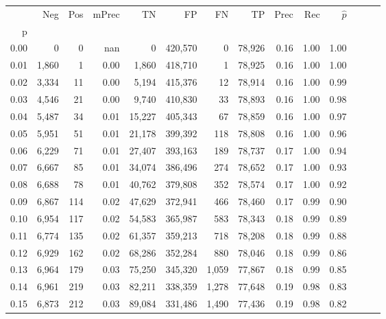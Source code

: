 \begin{tabular}{rrrrrrrrrrrrrr}
\toprule
{} &    Neg &    Pos & mPrec &       TN &       FP &      FN &      TP &  Prec &   Rec & $\hat{p}$ \\
p    &        &        &       &          &          &         &         &       &       &           \\
\midrule
0.00 &      0 &      0 &   nan &        0 &  420,570 &       0 &  78,926 &  0.16 &  1.00 &      1.00 \\
0.01 &  1,860 &      1 &  0.00 &    1,860 &  418,710 &       1 &  78,925 &  0.16 &  1.00 &      1.00 \\
0.02 &  3,334 &     11 &  0.00 &    5,194 &  415,376 &      12 &  78,914 &  0.16 &  1.00 &      0.99 \\
0.03 &  4,546 &     21 &  0.00 &    9,740 &  410,830 &      33 &  78,893 &  0.16 &  1.00 &      0.98 \\
0.04 &  5,487 &     34 &  0.01 &   15,227 &  405,343 &      67 &  78,859 &  0.16 &  1.00 &      0.97 \\
0.05 &  5,951 &     51 &  0.01 &   21,178 &  399,392 &     118 &  78,808 &  0.16 &  1.00 &      0.96 \\
0.06 &  6,229 &     71 &  0.01 &   27,407 &  393,163 &     189 &  78,737 &  0.17 &  1.00 &      0.94 \\
0.07 &  6,667 &     85 &  0.01 &   34,074 &  386,496 &     274 &  78,652 &  0.17 &  1.00 &      0.93 \\
0.08 &  6,688 &     78 &  0.01 &   40,762 &  379,808 &     352 &  78,574 &  0.17 &  1.00 &      0.92 \\
0.09 &  6,867 &    114 &  0.02 &   47,629 &  372,941 &     466 &  78,460 &  0.17 &  0.99 &      0.90 \\
0.10 &  6,954 &    117 &  0.02 &   54,583 &  365,987 &     583 &  78,343 &  0.18 &  0.99 &      0.89 \\
0.11 &  6,774 &    135 &  0.02 &   61,357 &  359,213 &     718 &  78,208 &  0.18 &  0.99 &      0.88 \\
0.12 &  6,929 &    162 &  0.02 &   68,286 &  352,284 &     880 &  78,046 &  0.18 &  0.99 &      0.86 \\
0.13 &  6,964 &    179 &  0.03 &   75,250 &  345,320 &   1,059 &  77,867 &  0.18 &  0.99 &      0.85 \\
0.14 &  6,961 &    219 &  0.03 &   82,211 &  338,359 &   1,278 &  77,648 &  0.19 &  0.98 &      0.83 \\
0.15 &  6,873 &    212 &  0.03 &   89,084 &  331,486 &   1,490 &  77,436 &  0.19 &  0.98 &      0.82 \\

\end{tabular}
